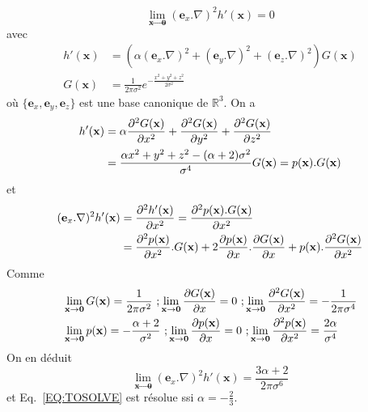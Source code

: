 \begin{equation}
    \lim_{\textbf{x}\to \textbf{0}} (\textbf{e}_x.\nabla)^2 h'(\textbf{x})=0
    \label{EQ:TOSOLVE}
\end{equation}
avec 
\begin{align}
h'(\textbf{x}) & = (\alpha(\textbf{e}_x.\nabla)^2 + (\textbf{e}_y.\nabla)^2 + (\textbf{e}_z.\nabla)^2)G(\textbf{x}) \nonumber \\
G(\textbf{x})& = \frac{1}{2 \pi \sigma^2}e^{-\frac{x^2 + y^2 + z^2}{2\sigma^2}} \nonumber
\end{align}
où $\{\textbf{e}_x, \textbf{e}_y, \textbf{e}_z\}$ est une base canonique de  $\mathbb  R^3$.
On a
\begin{align}
h'(\textbf{x}) & =   \alpha  \frac{\partial ^{2}G(\textbf{x})}{\partial x^2} + \frac{\partial ^{2}G(\textbf{x})}{\partial y^2} + \frac{\partial ^{2}G(\textbf{x})}{\partial z^2} \nonumber \\ 
& = \frac{\alpha x^2 + y^2 + z^2 - (\alpha+2) \sigma^2}{\sigma^4} G(\textbf{x}) = p(\textbf{x}).G(\textbf{x})
\nonumber
\end{align}
et
\begin{align}
    (\textbf{e}_x.\nabla)^2 h'(\textbf{x}) &= \frac{\partial ^{2}h'(\textbf{x})}{\partial x^2} = \frac{\partial ^{2}p(\textbf{x}).G(\textbf{x})}{\partial x^2} \nonumber\\
    & = \frac{\partial ^{2}p(\textbf{x})}{\partial x^2} .G(\textbf{x}) + 2 \frac{\partial p(\textbf{x})}{\partial x} . \frac{\partial G(\textbf{x})}{\partial x} + p(\textbf{x}). \frac{\partial ^{2}G(\textbf{x})}{\partial x^2} \nonumber
\end{align}
Comme
\begin{align}
    &\lim_{\textbf{x}\to \textbf{0}} G(\textbf{x}) = \frac{1}{2 \pi \sigma^2}~; 
    \lim_{\textbf{x}\to \textbf{0}} \frac{\partial G(\textbf{x})}{\partial x}  = 0~; 
    \lim_{\textbf{x}\to \textbf{0}} \frac{\partial ^{2}G(\textbf{x})}{\partial x^{2}}  = -\frac{1}{2 \pi \sigma^4} \nonumber\\
    &\lim_{\textbf{x}\to \textbf{0}} p(\textbf{x}) = - \frac{\alpha + 2}{\sigma^2}~; 
    \lim_{\textbf{x}\to \textbf{0}} \frac{\partial p(\textbf{x})}{\partial x}  = 0~; 
    \lim_{\textbf{x}\to \textbf{0}} \frac{\partial ^{2}p(\textbf{x})}{\partial x^{2}} = \frac{2 \alpha}{\sigma^4} \nonumber
\end{align}
On en déduit
\begin{equation}
\lim_{\textbf{x}\to \textbf{0}} (\textbf{e}_x.\nabla)^2 h'(\textbf{x}) = 
\frac{3\alpha + 2}{2 \pi \sigma^6} \nonumber
\end{equation}
et Eq.~\eqref{EQ:TOSOLVE} est résolue ssi $\alpha = -\frac{2}{3}$.


\normalfont




